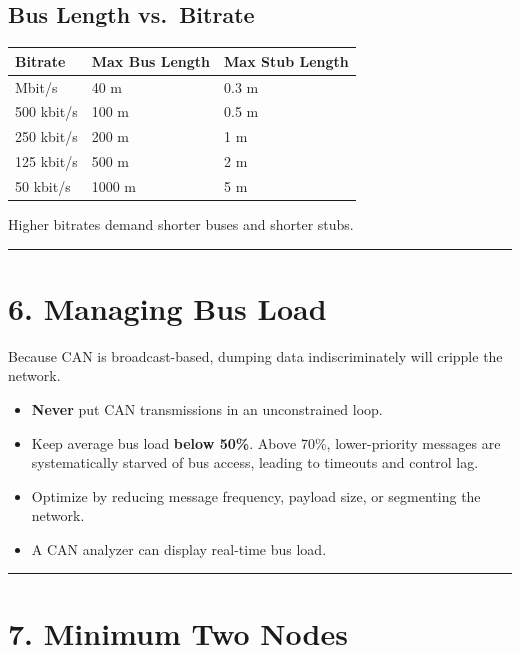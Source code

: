 \documentclass[12pt,a4paper,oneside]{report}
\providecommand{\tightlist}{\setlength{\itemsep}{0pt}\setlength{\parskip}{0pt}}
\begin{document}
\subsection{Bus Length vs.~Bitrate}\label{bus-length-vs.-bitrate}

\begin{longtable}[]{@{}lll@{}}
\toprule\noalign{}
Bitrate & Max Bus Length & Max Stub Length \\
\midrule\noalign{}
\endhead
\bottomrule\noalign{}
\endlastfoot
1 Mbit/s & 40 m & 0.3 m \\
500 kbit/s & 100 m & 0.5 m \\
250 kbit/s & 200 m & 1 m \\
125 kbit/s & 500 m & 2 m \\
50 kbit/s & 1000 m & 5 m \\
\end{longtable}

Higher bitrates demand shorter buses and shorter stubs.

\begin{center}\rule{0.5\linewidth}{0.5pt}\end{center}

\section{6. Managing Bus Load}\label{managing-bus-load}

Because CAN is broadcast-based, dumping data indiscriminately will cripple the
network.

\begin{itemize}
\tightlist
\item
  \textbf{Never} put CAN transmissions in an unconstrained loop.
\item
  Keep average bus load \textbf{below 50\%}. Above 70\%, lower-priority messages
  are systematically starved of bus access, leading to timeouts and control lag.
\item
  Optimize by reducing message frequency, payload size, or segmenting the
  network.
\item
  A CAN analyzer can display real-time bus load.
\end{itemize}

\begin{center}\rule{0.5\linewidth}{0.5pt}\end{center}

\section{7. Minimum Two Nodes}\label{minimum-two-nodes}
\end{document}
